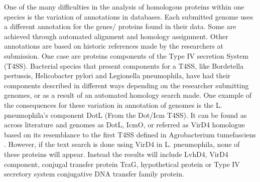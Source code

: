 \documentclass[a4,center,fleqn]{NAR}
\begin{document}
One of the many difficulties in the analysis of homologous proteins within one species is the variation of annotations in databases. Each submitted genome uses a different annotation for the genes/ proteins found in their data. Some are achieved through automated alignment and homology assignment. Other annotations are based on historic references made by the researchers at submission. One case are proteins components of the Type IV secretion System (T4SS). Bacterial species that present components for a T4SS, like Bordetella pertussis, Helicobacter pylori and Legionella pneumophila, have had their components described in different ways depending on the researcher submitting genomes,  or as a result of an automated homology search made. One example of the consequences for these variation in annotation of genomes is the L. pneumophila's component DotL (From the Dot/Icm T4SS). It can be found as across literature and genomes as DotL, IcmO, or referred as VirD4 homologue based on its resemblance to the first T4SS defined in Agrobacterium tumefasciens . However, if the text search is done using VirD4 in L. pneumophila, none of these proteins will appear. Instead the results will include LvhD4, VirD4 component, conjugal transfer protein TraG, hypothetical protein or Type IV secretory system conjugative DNA transfer family protein. 
\enlargethispage{-65.1pt}
\end{document}
